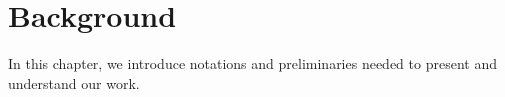 \chapter{Background}
\label{ch:background}
In this chapter, we introduce notations and preliminaries needed to present and understand our work. 





